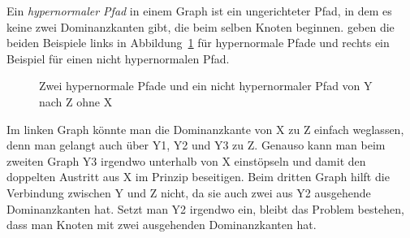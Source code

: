 Ein \emph{hypernormaler Pfad} in einem Graph ist ein ungerichteter Pfad, in dem es keine zwei
Dominanzkanten gibt, die beim selben Knoten beginnen. \citet{FKT2005a} geben die beiden Beispiele
links in Abbildung~\ref{Abbildung hypernormaler Graph} für hypernormale Pfade und rechts ein Beispiel für einen nicht hypernormalen Pfad.
\begin{figure}
\hfill
{}
\hfill
{}
\hfill
{}
\hfill\mbox{}
\caption{Zwei hypernormale Pfade und ein nicht hypernormaler Pfad von Y nach Z ohne X}\label{Abbildung hypernormaler Graph}
\end{figure}

Im linken Graph könnte man die Dominanzkante von X zu Z einfach weglassen, denn man gelangt auch
über Y1, Y2 und Y3 zu Z. Genauso kann man beim zweiten Graph Y3 irgendwo unterhalb von X einstöpseln
und damit den doppelten Austritt aus X im Prinzip beseitigen. Beim dritten Graph hilft die
Verbindung zwischen Y und Z nicht, da sie auch zwei aus Y2 ausgehende Dominanzkanten hat. Setzt man
Y2 irgendwo ein, bleibt das Problem bestehen, dass man Knoten mit zwei ausgehenden Dominanzkanten
hat.

